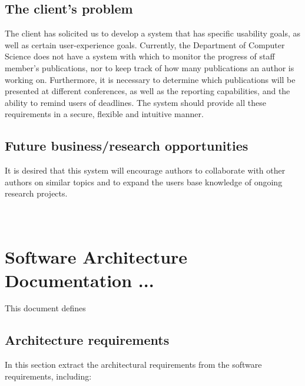 \documentclass[a4paper]{article}
\begin{document}
    \subsection{The client's problem}
    	The client has solicited us to develop a system that has specific usability goals, as well as certain user-experience goals. Currently, the Department of Computer Science does not have a system with which to monitor the progress of staff member's publications, nor to keep track of how many publications an author is working on. Furthermore, it is necessary to determine which publications will be presented at different conferences, as well as the reporting capabilities, and the ability to remind users of deadlines. The system should provide all these requirements in a secure, flexible and intuitive manner.
   
	
\subsection{Future business/research opportunities}
	It is desired that this system will encourage authors to collaborate with other authors on similar topics and to expand the users base knowledge of ongoing research projects.
	\\
	\\
	\\

\section{Software Architecture Documentation ...}
    
    This document defines 
    
\subsection{Architecture requirements}
        In this section extract the architectural requirements from the software requirements, including:
\end{document}
